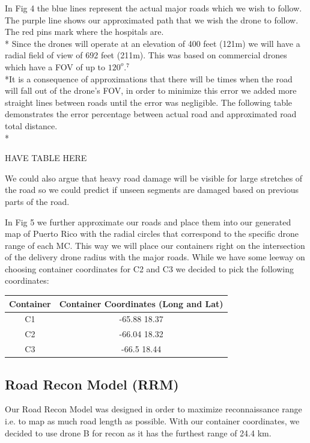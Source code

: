 \documentclass[a4paper,12pt]{article}
\begin{document}
\begin{itemize}
\newpage
In Fig 4 the blue lines represent the actual major roads which we wish to follow. The purple line shows our approximated path that we wish the drone to follow. The red pins mark where the hospitals are.\\*
Since the drones will operate at an elevation of 400 feet (121m) we will have a radial field of view of 692 feet (211m). This was based on commercial drones which have a FOV of up to $120^{o}$$.^{7}$
\\*It is a consequence of approximations that there will be times when the road will fall out of the drone's FOV, in order to minimize this error we added more straight lines between roads until the error was negligible.
The following table demonstrates the error percentage between actual road and approximated road total distance.\\*

HAVE TABLE HERE


We could also argue that heavy road damage will be visible for large stretches of the road so we could predict if unseen segments are damaged based on previous parts of the road.

In Fig 5 we further approximate our roads and place them into our generated map of Puerto Rico with the radial circles that correspond to the specific drone range of each MC.
This way we will place our containers right on the intersection of the delivery drone radius with the major roads.  While we have some leeway on choosing container coordinates for C2 and C3 we decided to pick the following coordinates:

\begin{center}
\begin{tabular}{ |c|c| }
 \hline
 Container & Container Coordinates (Long and Lat) \\\hline
  C1 & -65.88 18.37 \\
  C2 & -66.04 18.32  \\
  C3 & -66.5 18.44  \\
 \hline
\end{tabular}
\end{center}

\subsection{Road Recon Model (RRM)}
Our Road Recon Model was designed in order to maximize reconnaissance range i.e. to map as much road length as possible.
With our container coordinates, we decided to use drone B for recon as it has the furthest range of 24.4 km.


\end{itemize}
\end{document}
